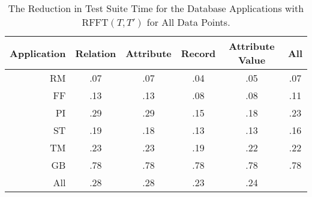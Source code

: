 \vspace*{-.25in}

\begin{table}[h]

\begin{center}

\begin{tabular}{r || c | c | c | c || c} 

  {\bf Application } & {\bf Relation} & {\bf Attribute} & {\bf Record} & 
  {\bf Attribute Value} & {\bf All} \\ \hline \hline

  RM  & .07  & .07 & .04 & .05 & .07

  \\ \hline

  FF  & .13 & .13 & .08 & .08 & .11

  \\ \hline

  PI & .29 & .29 & .15 & .18 & .23

  \\ \hline

  ST & .19 & .18 & .13 & .13 & .16

  \\ \hline

  TM & .23 & .23 & .19 & .22 & .22

  \\ \hline

  GB & .78 & .78 & .78 & .78 & .78 
        
  \\ \hline \hline

  {All} & .28 & .28 & .23 & .24  & 
 
\end{tabular} 

\end{center}

\caption{The Reduction in Test Suite Time for the Database
  Applications with $\mbox{RFFT}(T, T')$ for All Data Points.}
\label{fig:reductions}
\vspace*{-.1in}

\end{table}
